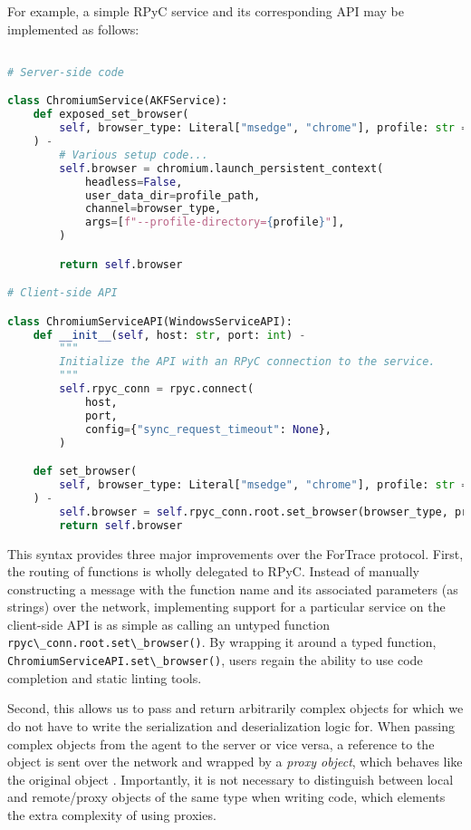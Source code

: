\documentclass[letterpaper,12pt]{report}
\newcommand{\passthrough}[1]{#1}
\begin{document}
For example, a simple RPyC service and its corresponding API may be
implemented as follows:

\begin{lstlisting}[language=Python]

# Server-side code

class ChromiumService(AKFService):
    def exposed_set_browser(
        self, browser_type: Literal["msedge", "chrome"], profile: str = "Default"
    ) -
        # Various setup code...
        self.browser = chromium.launch_persistent_context(
            headless=False,
            user_data_dir=profile_path,
            channel=browser_type,
            args=[f"--profile-directory={profile}"],
        )

        return self.browser

# Client-side API

class ChromiumServiceAPI(WindowsServiceAPI):
    def __init__(self, host: str, port: int) -
        """
        Initialize the API with an RPyC connection to the service.
        """
        self.rpyc_conn = rpyc.connect(
            host,
            port,
            config={"sync_request_timeout": None},
        )

    def set_browser(
        self, browser_type: Literal["msedge", "chrome"], profile: str = "Default"
    ) -
        self.browser = self.rpyc_conn.root.set_browser(browser_type, profile)
        return self.browser
\end{lstlisting}

This syntax provides three major improvements over the ForTrace
protocol. First, the routing of functions is wholly delegated to RPyC.
Instead of manually constructing a message with the function name and
its associated parameters (as strings) over the network, implementing
support for a particular service on the client-side API is as simple as
calling an untyped function
\passthrough{\lstinline!rpyc\_conn.root.set\_browser()!}. By wrapping it
around a typed function,
\passthrough{\lstinline!ChromiumServiceAPI.set\_browser()!}, users
regain the ability to use code completion and static linting tools.

Second, this allows us to pass and return arbitrarily complex objects
for which we do not have to write the serialization and deserialization
logic for. When passing complex objects from the agent to the server or
vice versa, a reference to the object is sent over the network and
wrapped by a \emph{proxy object}, which behaves like the original object
\cite{TheoryOperationRPyC}. Importantly, it is not necessary to
distinguish between local and remote/proxy objects of the same type when
writing code, which elements the extra complexity of using proxies.
\end{document}

